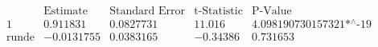\[\begin{array}{l|llll}
 \text{} & \text{Estimate} & \text{Standard Error} & \text{t-Statistic} & \text{P-Value} \\
\hline
 1 & 0.911831 & 0.0827731 & 11.016 & \text{4.098190730157321$\grave{ }$*${}^{\wedge}$-19} \\
 \text{runde} & -0.0131755 & 0.0383165 & -0.34386 & 0.731653 \\
\end{array}\]

